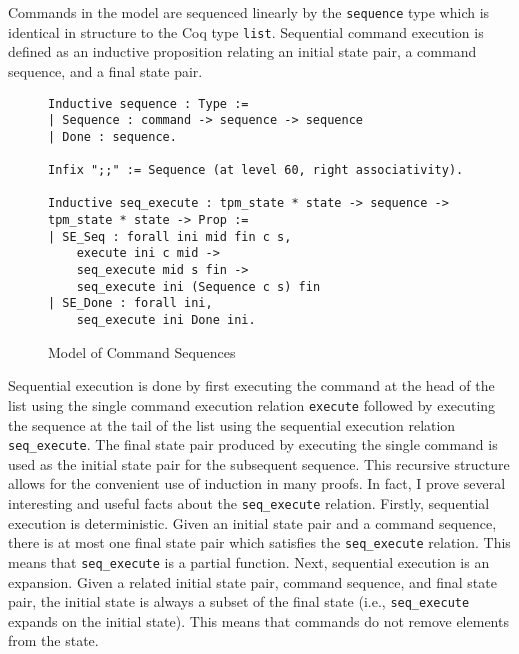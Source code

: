 Commands in the model are sequenced linearly by the \verb|sequence| type which is identical in structure to the Coq type \verb|list|. Sequential command execution is defined as an inductive proposition relating an initial state pair, a command sequence, and a final state pair. 
\begin{figure}[h]
\begin{lstlisting}[language=Coq]
Inductive sequence : Type :=
| Sequence : command -> sequence -> sequence
| Done : sequence.

Infix ";;" := Sequence (at level 60, right associativity).

Inductive seq_execute : tpm_state * state -> sequence -> tpm_state * state -> Prop :=
| SE_Seq : forall ini mid fin c s,
    execute ini c mid ->
    seq_execute mid s fin ->
    seq_execute ini (Sequence c s) fin
| SE_Done : forall ini,
    seq_execute ini Done ini.
\end{lstlisting}
\caption{Model of Command Sequences}
\end{figure}
Sequential execution is done by first executing the command at the head of the list using the single command execution relation \verb|execute| followed by executing the sequence at the tail of the list using the sequential execution relation \verb|seq_execute|. The final state pair produced by executing the single command is used as the initial state pair for the subsequent sequence. This recursive structure allows for the convenient use of induction in many proofs.
In fact, I prove several interesting and useful facts about the \verb|seq_execute| relation. Firstly, sequential execution is deterministic. Given an initial state pair and a command sequence, there is at most one final state pair which satisfies the \verb|seq_execute| relation. This means that \verb|seq_execute| is a partial function. Next, sequential execution is an expansion. Given a related initial state pair, command sequence, and final state pair, the initial state is always a subset of the final state (i.e., \verb|seq_execute| expands on the initial state). This means that commands do not remove elements from the state.  
